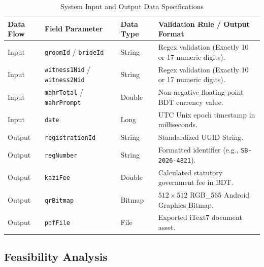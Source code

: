 \documentclass[12pt,a4paper]{article}
\begin{document}
	\begin{table}[h!]
		\centering
		\small
		\caption{System Input and Output Data Specifications}
		\label{tab:data_specs}
		\begin{tabularx}{\textwidth}{@{}l L l L@{}}
			\toprule
			\textbf{Data Flow} & \textbf{Field Parameter} & \textbf{Data Type} & \textbf{Validation Rule / Output Format} \\ \midrule
			Input & \texttt{groomId} / \texttt{brideId} & String & Regex validation (Exactly 10 or 17 numeric digits). \\
			Input & \texttt{witness1Nid} / \texttt{witness2Nid} & String & Regex validation (Exactly 10 or 17 numeric digits). \\
			Input & \texttt{mahrTotal} / \texttt{mahrPrompt} & Double & Non-negative floating-point BDT currency value. \\
			Input & \texttt{date} & Long & UTC Unix epoch timestamp in milliseconds. \\ \midrule
			Output & \texttt{registrationId} & String & Standardized UUID String. \\
			Output & \texttt{regNumber} & String & Formatted identifier (e.g., \texttt{SB-2026-4821}). \\
			Output & \texttt{kaziFee} & Double & Calculated statutory government fee in BDT. \\
			Output & \texttt{qrBitmap} & Bitmap & $512\times512$ RGB\_565 Android Graphics Bitmap. \\
			Output & \texttt{pdfFile} & File & Exported iText7 document asset. \\ \bottomrule
		\end{tabularx}
	\end{table}
	
	\clearpage
	\subsection{Feasibility Analysis}
	
\end{document}
